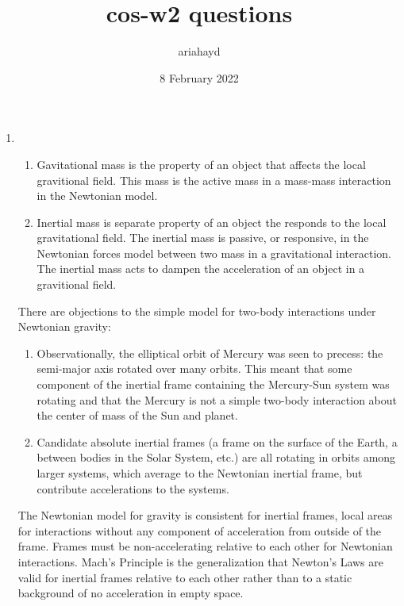 \documentclass{paper}
\title{cos-w2 questions}
\author{ariahayd}
\date{8 February 2022}
\begin{document}
 

\setlength{\fboxsep}{0pt}
\setlength{\fboxrule}{0pt}

\maketitle

\begin{enumerate}
    \item %
      \begin{enumerate}
        \item
          Gavitational mass is the property of an object that affects the
          local gravitional field. This mass is the active mass in a mass-mass
          interaction in the Newtonian model.
        \item
          Inertial mass is separate property of an object the responds to
          the local gravitational field. The inertial mass is passive, or 
          responsive, in the Newtonian forces model between two mass in a 
          gravitational interaction. The inertial mass acts to dampen the
          acceleration of an object in a gravitional field.
      \end{enumerate}

      There are objections to the simple model for two-body interactions
      under Newtonian gravity:
      \begin{enumerate}
        \item
          Observationally, the elliptical orbit of Mercury was seen to
          precess: the semi-major axis rotated over many orbits. This meant
          that some component of the inertial frame containing the 
          Mercury-Sun system was rotating and that the Mercury is not a simple 
          two-body interaction about the center of mass of the Sun and planet.
        \item
          Candidate absolute inertial frames (a frame on the surface of the
          Earth, a between bodies in the Solar System, etc.) are all rotating
          in orbits among larger systems, which average to the Newtonian 
          inertial frame, but contribute accelerations to the systems. 
      \end{enumerate}
      
      The Newtonian model for gravity is consistent for inertial frames, local
      areas for interactions without any component of acceleration from 
      outside of the frame. Frames must be non-accelerating relative to 
      each other for Newtonian interactions. Mach's Principle is
      the generalization that Newton's Laws are valid for inertial frames 
      relative to each other rather than to a static background of no 
      acceleration in empty space.



\end{enumerate}
\end{document}

